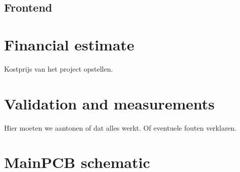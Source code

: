\documentclass[11pt,a4paper]{article}
\begin{document}
\subsection{Frontend}


\section{Financial estimate}
Kostprijs van het project opstellen.

\section{Validation and measurements}
Hier moeten we aantonen of dat alles werkt. Of eventuele fouten verklaren.

\newpage
	

\newpage
\appendix
\section{MainPCB schematic}\label{app:mainpcb_schematic}


\newpage
\end{document}
